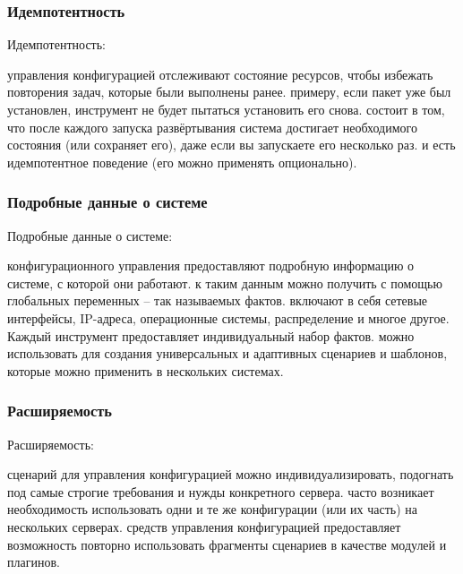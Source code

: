 \documentclass{../industrial-development}
\begin{document}
\lecturenotes

\begin{frame} \frametitle{Идемпотентность}
   \begin{block}{Идемпотентность:}
  \begin{itemize}
 управления конфигурацией отслеживают состояние ресурсов, чтобы избежать повторения задач, которые были выполнены ранее. 
 примеру, если пакет уже был установлен, инструмент не будет пытаться установить его снова. 
 состоит в том, что после каждого запуска развёртывания система достигает необходимого состояния (или сохраняет его), даже если вы запускаете его несколько раз. 
 и есть идемпотентное поведение (его можно применять опционально).

  \end{itemize}
	\end{block}
\end{frame}

\lecturenotes

\begin{frame} \frametitle{Подробные данные о системе }
  \begin{block}{Подробные данные о системе:}
  \begin{itemize}
 конфигурационного управления предоставляют подробную информацию о системе, с которой они работают. 
 к таким данным можно получить с помощью глобальных переменных – так называемых фактов. 
 включают в себя сетевые интерфейсы, IP-адреса, операционные системы, распределение и многое другое. Каждый инструмент предоставляет индивидуальный набор фактов.
 можно использовать для создания универсальных и адаптивных сценариев и шаблонов, которые можно применить в нескольких системах.


  \end{itemize}
	\end{block}
\end{frame}

\lecturenotes

\begin{frame} \frametitle{Расширяемость }
  \begin{block}{Расширяемость: }
  \begin{itemize}
 сценарий для управления конфигурацией можно индивидуализировать, подогнать под самые строгие требования и нужды конкретного сервера. 
 часто возникает необходимость использовать одни и те же конфигурации (или их часть) на нескольких серверах. 
 средств управления конфигурацией предоставляет возможность повторно использовать фрагменты сценариев в качестве модулей и плагинов.

  \end{itemize}
	\end{block}
\end{frame}
\end{document}
